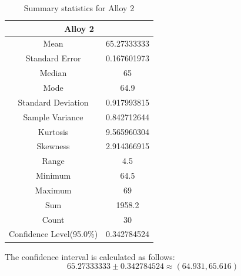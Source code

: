 \documentclass[letterpaper]{article}
\begin{document}
\begin{table}[H]
 \centering
 \begin{tabular}{|c|c|}
  \hline  \multicolumn{2}{|c|}{Alloy 2}  \\ \hline
  Mean                     & 65.27333333 \\ \hline
  Standard Error           & 0.167601973 \\ \hline
  Median                   & 65          \\ \hline
  Mode                     & 64.9        \\ \hline
  Standard Deviation       & 0.917993815 \\ \hline
  Sample Variance          & 0.842712644 \\ \hline
  Kurtosis                 & 9.565960304 \\ \hline
  Skewness                 & 2.914366915 \\ \hline
  Range                    & 4.5         \\ \hline
  Minimum                  & 64.5        \\ \hline
  Maximum                  & 69          \\ \hline
  Sum                      & 1958.2      \\ \hline
  Count                    & 30          \\ \hline
  Confidence Level(95.0\%) & 0.342784524 \\ \hline
 \end{tabular}
 \caption{Summary statistics for Alloy 2}
 \label{3a2}
\end{table}

The confidence interval is calculated as follows:
$$65.27333333 \pm 0.342784524 \approx (64.931, 65.616)$$
\end{document}
